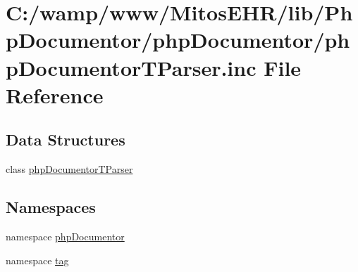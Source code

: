 \hypertarget{php_documentor_t_parser_8inc}{\section{\-C\-:/wamp/www/\-Mitos\-E\-H\-R/lib/\-Php\-Documentor/php\-Documentor/php\-Documentor\-T\-Parser.inc \-File \-Reference}
\label{php_documentor_t_parser_8inc}
}
\subsection*{\-Data \-Structures}
\begin{DoxyCompactItemize}
\item 
class \hyperlink{classphp_documentor_t_parser}{php\-Documentor\-T\-Parser}
\end{DoxyCompactItemize}
\subsection*{\-Namespaces}
\begin{DoxyCompactItemize}
\item 
namespace \hyperlink{namespacephp_documentor}{php\-Documentor}
\item 
namespace \hyperlink{namespacetag}{tag}
\end{DoxyCompactItemize}
